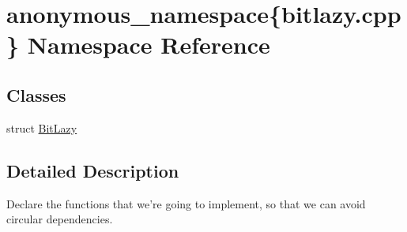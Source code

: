 \hypertarget{namespaceanonymous__namespace_02bitlazy_8cpp_03}{\section{anonymous\-\_\-namespace\{bitlazy.\-cpp\} Namespace Reference}
\label{namespaceanonymous__namespace_02bitlazy_8cpp_03}
}
\subsection*{Classes}
\begin{DoxyCompactItemize}
\item 
struct \hyperlink{structanonymous__namespace_02bitlazy_8cpp_03_1_1BitLazy}{Bit\-Lazy}
\end{DoxyCompactItemize}


\subsection{Detailed Description}
Declare the functions that we're going to implement, so that we can avoid circular dependencies. 